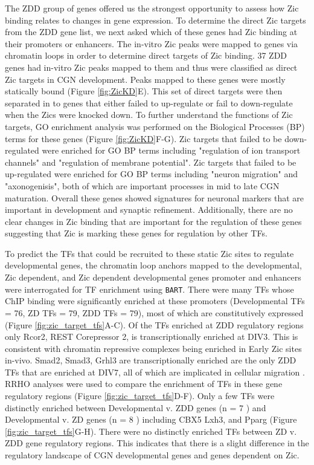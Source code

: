 \documentclass[fleqn,10pt]{wlscirep}
\begin{document}
The ZDD group of genes offered us the strongest opportunity to assess how Zic binding relates to changes in gene expression. To determine the direct Zic targets from the ZDD gene list, we next asked which of these genes had Zic binding at their promoters or enhancers. The in-vitro Zic peaks were mapped to genes via chromatin loops in order to determine direct targets of Zic binding. 37 ZDD genes had in-vitro Zic peaks mapped to them and thus were classified as direct Zic targets in CGN development. Peaks mapped to these genes were mostly statically bound (Figure \ref{fig:ZicKD}E). This set of direct targets were then separated in to genes that either failed to up-regulate or fail to down-regulate when the Zics were knocked down. To further understand the functions of Zic targets, GO enrichment analysis was performed on the Biological Processes (BP) terms for these genes (Figure \ref{fig:ZicKD}F-G). Zic targets that failed to be down-regulated were enriched for GO BP terms including "regulation of ion transport channels" and "regulation of membrane potential". Zic targets that failed to be up-regulated were enriched for GO BP  terms including "neuron migration" and "axonogenisis", both of which are important processes in mid to late CGN maturation. Overall these genes showed signatures for neuronal markers that are important in development and synaptic refinement. Additionally, there are no clear changes in Zic binding that are important for the regulation of these genes suggesting that Zic is marking these genes for  regulation by other TFs.

To predict the TFs that could be recruited to these static Zic sites to regulate developmental genes, the chromatin loop anchors mapped to the developmental, Zic dependent, and Zic dependent developmental genes promoter and enhancers were interrogated for TF enrichment using \texttt{BART}. 
There were many TFs whose ChIP binding were significantly enriched at these promoters (Developmental TFs = 76,  ZD TFs = 79, ZDD TFs = 79), most of which are constitutively expressed (Figure \ref{fig:zic_target_tfs}A-C). Of the TFs enriched at ZDD regulatory regions only Rcor2, REST Corepressor 2, is transcriptionally enriched at DIV3. This is consistent with chromatin repressive complexes being enriched in Early Zic sites in-vivo. Smad2, Smad3, Grhl3 are transcriptionally enriched are the only ZDD TFs that are enriched at DIV7, all of which are implicated in cellular migration \cite{Li2011ComparativeLine, Kashgari2021GRHL3Reepithelialization}. RRHO analyses were used to compare the enrichment of TFs in these gene regulatory regions (Figure \ref{fig:zic_target_tfs}D-F). Only a few TFs were distinctly enriched between Developmental v. ZDD genes (n = 7 ) and Developmental v. ZD genes (n = 8 ) including CBX5 Lxh3, and Pparg (Figure \ref{fig:zic_target_tfs}G-H). There were no distinctly enriched TFs between ZD v. ZDD gene regulatory regions. This indicates that there is a slight difference in the regulatory landscape of CGN developmental genes and genes dependent on Zic. 
\end{document}
